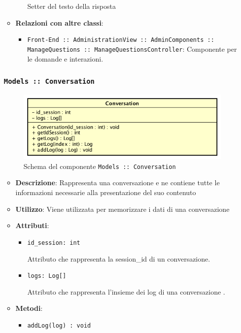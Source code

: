 \documentclass[../DefinizioneDiProdotto.tex]{subfiles}
\begin{document}
\begin{itemize}
\begin{itemize}
\begin{itemize}
	 Setter del testo della risposta
	\end{itemize}\vspace{0.5em}
	\item \textbf{Relazioni con altre classi}:
	\begin{itemize}
	\item \texttt{Front-End :: AdministrationView :: AdminComponents :: ManageQuestions :: ManageQuestionsController}: Componente per le domande e interazioni.
	\end{itemize}
	\end{itemize}

	\newpage
	\subsubsection{\texttt{Models :: Conversation}}
	\begin{figure}[!h]
		\centering
		\includegraphics[scale=0.7]{Architettura/Models/Conversation.png}
		\caption{Schema del componente \texttt{Models :: Conversation}}
	\end{figure}
	\begin{itemize}\item \textbf{Descrizione}: Rappresenta una conversazione e ne contiene tutte le informazioni necessarie alla presentazione del suo contenuto
	\item \textbf{Utilizzo}: Viene utilizzata per memorizzare i dati di una conversazione
	\item \textbf{Attributi}:
	\begin{itemize}
	\item \texttt{id\_session: int}\

	 Attributo che rappresenta la session\_id di un conversazione.
	\end{itemize}
	\begin{itemize}
	\item \texttt{logs: Log[]}\

	 Attributo che rappresenta l'insieme dei log di una conversazione
	.
	\end{itemize}
	\item \textbf{Metodi}:
	\begin{itemize}
	\item \texttt{addLog(log) : void}\


\end{itemize}
\end{itemize}
\end{itemize}
\end{document}
